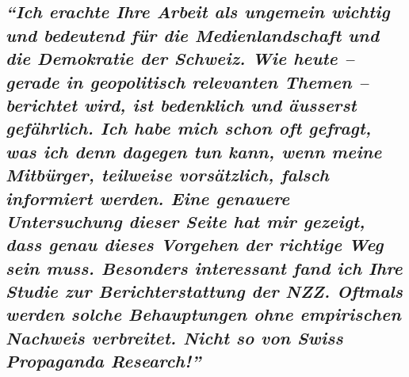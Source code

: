 \hypertarget{ich-erachte-ihre-arbeit-als-ungemein-wichtig-und-bedeutend-fuxfcr-die-medienlandschaft-und-die-demokratie-der-schweiz-wie-heute--gerade-in-geopolitisch-relevanten-themen--berichtet-wird-ist-bedenklich-und-uxe4usserst-gefuxe4hrlich-ich-habe-mich-schon-oft-gefragt-was-ich-denn-dagegen-tun-kann-wenn-meine-mitbuxfcrger-teilweise-vorsuxe4tzlich-falsch-informiert-werden-eine-genauere-untersuchung-dieser-seite-hat-mir-gezeigt-dass-genau-dieses-vorgehen-der-richtige-weg-sein-muss-besonders-interessant-fand-ich-ihre-studie-zur-berichterstattung-der-nzz-oftmals-werden-solche-behauptungen-ohne-empirischen-nachweis-verbreitet-nicht-so-von-swiss-propaganda-research}{%
\subsection{\texorpdfstring{\emph{``Ich erachte Ihre Arbeit als ungemein
wichtig und bedeutend für die Medienlandschaft und die Demokratie der
Schweiz. Wie heute -- gerade in geopolitisch relevanten Themen --
berichtet wird, ist bedenklich und äusserst gefährlich. Ich habe mich
schon oft gefragt, was ich denn dagegen tun kann, wenn meine Mitbürger,
teilweise vorsätzlich, falsch informiert werden. Eine genauere
Untersuchung dieser Seite hat mir gezeigt, dass genau dieses Vorgehen
der richtige Weg sein muss. Besonders interessant fand ich Ihre Studie
zur Berichterstattung der NZZ. Oftmals werden solche Behauptungen ohne
empirischen Nachweis verbreitet. Nicht so von Swiss Propaganda
Research!''}}{``Ich erachte Ihre Arbeit als ungemein wichtig und bedeutend für die Medienlandschaft und die Demokratie der Schweiz. Wie heute -- gerade in geopolitisch relevanten Themen -- berichtet wird, ist bedenklich und äusserst gefährlich. Ich habe mich schon oft gefragt, was ich denn dagegen tun kann, wenn meine Mitbürger, teilweise vorsätzlich, falsch informiert werden. Eine genauere Untersuchung dieser Seite hat mir gezeigt, dass genau dieses Vorgehen der richtige Weg sein muss. Besonders interessant fand ich Ihre Studie zur Berichterstattung der NZZ. Oftmals werden solche Behauptungen ohne empirischen Nachweis verbreitet. Nicht so von Swiss Propaganda Research!''}}\label{ich-erachte-ihre-arbeit-als-ungemein-wichtig-und-bedeutend-fuxfcr-die-medienlandschaft-und-die-demokratie-der-schweiz-wie-heute--gerade-in-geopolitisch-relevanten-themen--berichtet-wird-ist-bedenklich-und-uxe4usserst-gefuxe4hrlich-ich-habe-mich-schon-oft-gefragt-was-ich-denn-dagegen-tun-kann-wenn-meine-mitbuxfcrger-teilweise-vorsuxe4tzlich-falsch-informiert-werden-eine-genauere-untersuchung-dieser-seite-hat-mir-gezeigt-dass-genau-dieses-vorgehen-der-richtige-weg-sein-muss-besonders-interessant-fand-ich-ihre-studie-zur-berichterstattung-der-nzz-oftmals-werden-solche-behauptungen-ohne-empirischen-nachweis-verbreitet-nicht-so-von-swiss-propaganda-research}}

